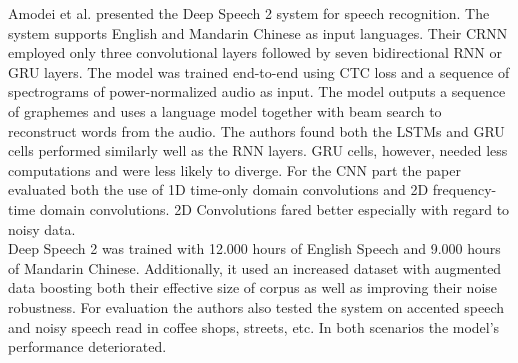 Amodei et al. presented the Deep Speech 2 system for speech recognition. The system supports English and Mandarin Chinese as input languages.\cite{amodei2015deep} Their CRNN employed only three convolutional layers followed by seven bidirectional RNN or GRU layers. The model was trained end-to-end using CTC loss and a sequence of spectrograms of power-normalized audio as input. The model outputs a sequence of graphemes and uses a language model together with beam search to reconstruct words from the audio. The authors found both the LSTMs and GRU cells performed similarly well as the RNN layers. GRU cells, however, needed less computations and were less likely to diverge. For the CNN part the paper evaluated both the use of 1D time-only domain convolutions and 2D frequency-time domain convolutions. 2D Convolutions fared better especially with regard to noisy data.\\ 
Deep Speech 2 was trained with 12.000 hours of English Speech and 9.000 hours of Mandarin Chinese. Additionally, it used an increased dataset with augmented data boosting both their effective size of corpus as well as improving their noise robustness. For evaluation the authors also tested the system on accented speech and noisy speech read in coffee shops, streets, etc. In both scenarios the model's performance deteriorated.

